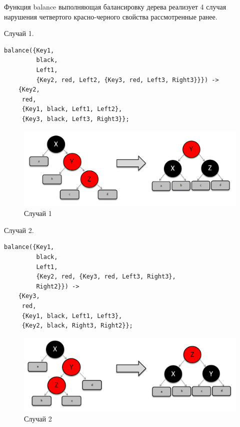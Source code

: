			Функция balance выполняющая балансировку дерева реализует 4 случая нарушения 
			четвертого красно-черного свойства рассмотренные ранее.
			
			Случай 1.
			\begin{lstlisting}
balance({Key1, 
         black, 
         Left1, 
         {Key2, red, Left2, {Key3, red, Left3, Right3}}}) ->    
    {Key2, 
     red, 
     {Key1, black, Left1, Left2}, 
     {Key3, black, Left3, Right3}};		    
			\end{lstlisting}
			\begin{figure}[H]
				\centering
				\includegraphics[width=\textwidth]{img/insert/clause_1.png}
				\caption{Случай 1}
			\end{figure}
			
			Случай 2.
			\begin{lstlisting}
balance({Key1, 
         black, 
         Left1, 
         {Key2, red, {Key3, red, Left3, Right3}, 
         Right2}}) ->   
    {Key3, 
     red, 
     {Key1, black, Left1, Left3}, 
     {Key2, black, Right3, Right2}};	    
			\end{lstlisting} 
			\begin{figure}[H]
				\centering
				\includegraphics[width=\textwidth]{img/insert/clause_2.png}
				\caption{Случай 2}
			\end{figure}
			
